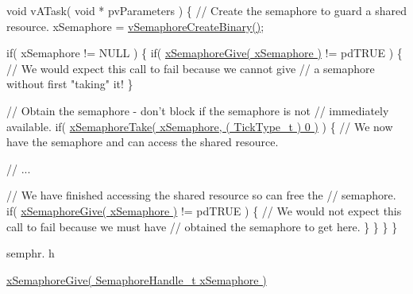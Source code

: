 \begin{DoxyPre}void vATask( void * pvParameters )
\{
 // Create the semaphore to guard a shared resource.
 xSemaphore = \hyperlink{vendor_2ceedling_2plugins_2freertos_2src_2freertos_2include_2semphr_8h_ae10bffadd26fbd5bcce76bf33a83ef30}{vSemaphoreCreateBinary()};\end{DoxyPre}



\begin{DoxyPre} if( xSemaphore != NULL )
 \{
     if( \hyperlink{vendor_2ceedling_2plugins_2freertos_2src_2freertos_2include_2semphr_8h_aae55761cabfa9bf85c8f4430f78c0953}{xSemaphoreGive( xSemaphore )} != pdTRUE )
     \{
         // We would expect this call to fail because we cannot give
         // a semaphore without first "taking" it!
     \}\end{DoxyPre}



\begin{DoxyPre}     // Obtain the semaphore - don't block if the semaphore is not
     // immediately available.
     if( \hyperlink{vendor_2ceedling_2plugins_2freertos_2src_2freertos_2include_2semphr_8h_af116e436d2a5ae5bd72dbade2b5ea930}{xSemaphoreTake( xSemaphore, ( TickType\_t ) 0 )} )
     \{
         // We now have the semaphore and can access the shared resource.\end{DoxyPre}



\begin{DoxyPre}         // ...\end{DoxyPre}



\begin{DoxyPre}         // We have finished accessing the shared resource so can free the
         // semaphore.
         if( \hyperlink{vendor_2ceedling_2plugins_2freertos_2src_2freertos_2include_2semphr_8h_aae55761cabfa9bf85c8f4430f78c0953}{xSemaphoreGive( xSemaphore )} != pdTRUE )
         \{
             // We would not expect this call to fail because we must have
             // obtained the semaphore to get here.
         \}
     \}
 \}
\}
\end{DoxyPre}


semphr. h 
\begin{DoxyPre}\hyperlink{vendor_2ceedling_2plugins_2freertos_2src_2freertos_2include_2semphr_8h_aae55761cabfa9bf85c8f4430f78c0953}{xSemaphoreGive( SemaphoreHandle\_t xSemaphore )}\end{DoxyPre}


